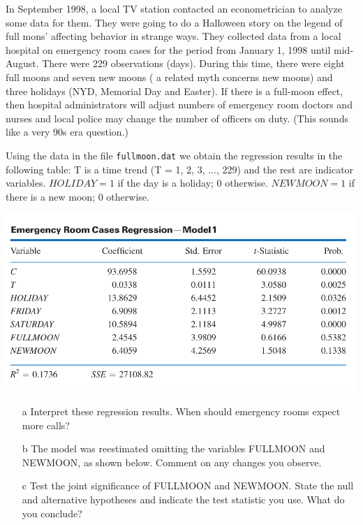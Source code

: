 \documentclass[xcolor={dvipsnames}]{beamer}
\begin{document}
	\begin{frame}[allowframebreaks]{7.2}
	In September 1998, a local TV station contacted an econometrician to analyze some data for them. They were going to do a Halloween story on the legend of full mons' affecting behavior in strange ways. They collected data from a local hospital on emergency room cases for the period from January 1, 1998 until mid-August. There were 229 observations (days). During this time, there were eight full moons and seven new moons ( a related myth concerns new moons) and three holidays (NYD, Memorial Day and Easter). If there is a full-moon effect, then hospital administrators will adjust numbers of emergency room doctors and nurses and local police may change the number of officers on duty. (This sounds like a very 90s era question.)
	
	Using the data in the file \texttt{fullmoon.dat} we obtain the regression results in the following table: T is a time trend (T = 1, 2, 3, ..., 229) and the rest are indicator variables. $HOLIDAY = 1$ if the day is a holiday; 0 otherwise. $NEWMOON = 1$ if there is a new moon; 0 otherwise.
	
	\includegraphics{TableMoonReg.png}
	
	\begin{itemize}
		\item[a] Interpret these regression results. When should emergency rooms expect more calls?
		
		\item[b] The model was reestimated omitting the variables FULLMOON and NEWMOON, as shown below. Comment on any changes you observe.
		
		\item[c] Test the joint significance of FULLMOON and NEWMOON. State the null and alternative hypotheses and indicate the test statistic you use. What do you conclude?
		

\end{itemize}
\end{frame}
\end{document}
